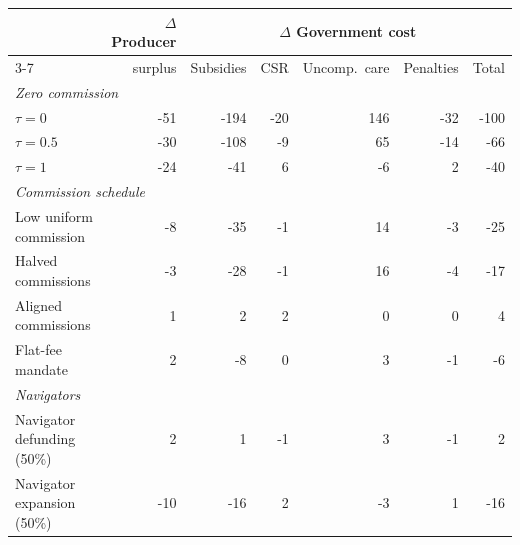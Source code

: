 \begin{tabular}{lrrrrrr}
\hline\hline
 & $\Delta$ Producer & \multicolumn{5}{c}{$\Delta$ Government cost} \\
\cline{3-7}
 & surplus & Subsidies & CSR & Uncomp.\ care & Penalties & Total \\
\hline
\multicolumn{7}{l}{\emph{Zero commission}} \\
\quad $\tau = 0$ & -51 & -194 & -20 & 146 & -32 & -100 \\
\quad $\tau = 0.5$ & -30 & -108 & -9 & 65 & -14 & -66 \\
\quad $\tau = 1$ & -24 & -41 & 6 & -6 & 2 & -40 \\
\multicolumn{7}{l}{\emph{Commission schedule}} \\
\quad Low uniform commission & -8 & -35 & -1 & 14 & -3 & -25 \\
\quad Halved commissions & -3 & -28 & -1 & 16 & -4 & -17 \\
\quad Aligned commissions & 1 & 2 & 2 & 0 & 0 & 4 \\
\quad Flat-fee mandate & 2 & -8 & 0 & 3 & -1 & -6 \\
\multicolumn{7}{l}{\emph{Navigators}} \\
\quad Navigator defunding (50\%) & 2 & 1 & -1 & 3 & -1 & 2 \\
\quad Navigator expansion (50\%) & -10 & -16 & 2 & -3 & 1 & -16 \\
\hline\hline
\end{tabular}
